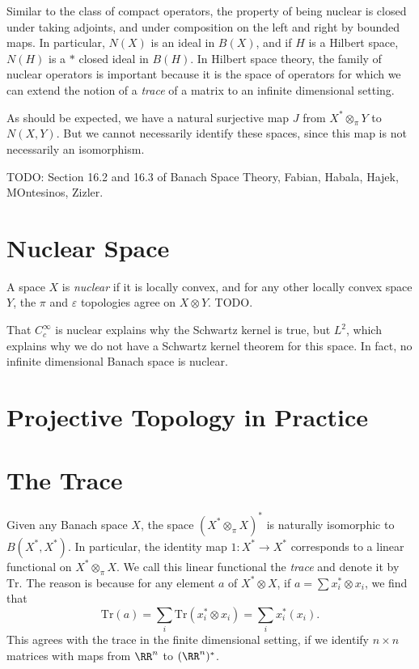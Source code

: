 Similar to the class of compact operators, the property of being nuclear is closed under taking adjoints, and under composition on the left and right by bounded maps. In particular, $N(X)$ is an ideal in $B(X)$, and if $H$ is a Hilbert space, $N(H)$ is a $*$ closed ideal in $B(H)$. In Hilbert space theory, the family of nuclear operators is important because it is the space of operators for which we can extend the notion of a \emph{trace} of a matrix to an infinite dimensional setting.

As should be expected, we have a natural surjective map $J$ from $X^* \otimes_\pi Y$ to $N(X,Y)$. But we cannot necessarily identify these spaces, since this map is not necessarily an isomorphism.

TODO: Section 16.2 and 16.3 of Banach Space Theory, Fabian, Habala, Hajek, MOntesinos, Zizler.

\section{Nuclear Space}

A space $X$ is \emph{nuclear} if it is locally convex, and for any other locally convex space $Y$, the $\pi$ and $\varepsilon$ topologies agree on $X \otimes Y$. TODO.

That $C_c^\infty$ is nuclear explains why the Schwartz kernel is true, but $L^2$, which explains why we do not have a Schwartz kernel theorem for this space. In fact, no infinite dimensional Banach space is nuclear.

\section{Projective Topology in Practice}



\section{The Trace}

Given any Banach space $X$, the space $(X^* \otimes_\pi X)^*$ is naturally isomorphic to $B(X^*,X^*)$. In particular, the identity map $1: X^* \to X^*$ corresponds to a linear functional on $X^* \otimes_\pi X$. We call this linear functional the \emph{trace} and denote it by $\text{Tr}$. The reason is because for any element $a$ of $X^* \otimes X$, if $a = \sum x_i^* \otimes x_i$, we find that
%
\[ \text{Tr}(a) = \sum_i \text{Tr}(x_i^* \otimes x_i) = \sum_i x_i^*(x_i). \]
%
This agrees with the trace in the finite dimensional setting, if we identify $n \times n$ matrices with maps from $\RR^n$ to $(\RR^n)^*$.

